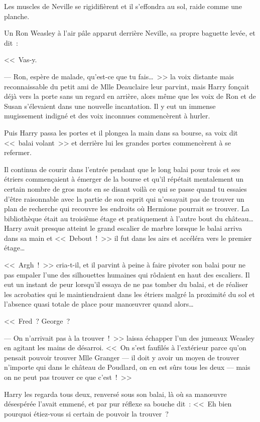 Les muscles de Neville se rigidifièrent et il s'effondra au sol, raide comme une planche.

Un Ron Weasley à l'air pâle apparut derrière Neville, sa propre baguette levée, et dit~:

<<~Vas-y.

--- Ron, espère de malade, qu'est-ce que tu fais…~>> la voix distante mais reconnaissable du petit ami de Mlle Deauclaire leur parvint, mais Harry fonçait déjà vers la porte sans un regard en arrière, alors même que les voix de Ron et de Susan s'élevaient dans une nouvelle incantation. Il y eut un immense mugissement indigné et des voix inconnues commencèrent à hurler.

Puis Harry passa les portes et il plongea la main dans sa bourse, sa voix dit <<~balai volant~>> et derrière lui les grandes portes commencèrent à se refermer.

Il continua de courir dans l'entrée pendant que le long balai pour trois et ses étriers commençaient à émerger de la bourse et qu'il répétait mentalement un certain nombre de gros mots en se disant voilà ce qui se passe quand tu essaies d'être raisonnable avec la partie de son esprit qui n'essayait pas de trouver un plan de recherche qui recouvre les endroits où Hermione pourrait se trouver. La bibliothèque était au troisième étage et pratiquement à l'autre bout du château… Harry avait presque atteint le grand escalier de marbre lorsque le balai arriva dans sa main et <<~Debout~!~>> il fut dans les airs et accéléra vers le premier étage…

<<~Argh~!~>> cria-t-il, et il parvint à peine à faire pivoter son balai pour ne pas empaler l'une des silhouettes humaines qui rôdaient en haut des escaliers. Il eut un instant de peur lorsqu'il essaya de ne pas tomber du balai, et de réaliser les acrobaties qui le maintiendraient dans les étriers malgré la proximité du sol et l'absence quasi totale de place pour manœuvrer quand alors…

<<~Fred~? George~?

--- On n'arrivait pas à la trouver~!~>> laissa échapper l'un des jumeaux Weasley en agitant les mains de désarroi. <<~On s'est faufilés à l'extérieur parce qu'on pensait pouvoir trouver Mlle Granger — il doit y avoir un moyen de trouver n'importe qui dans le château de Poudlard, on en est sûrs tous les deux — mais on ne peut pas trouver ce que c'est~!~>>

Harry les regarda tous deux, renversé sous son balai, là où sa manœuvre désespérée l'avait emmené, et par pur réflexe sa bouche dit~: <<~Eh bien pourquoi étiez-vous si certain de pouvoir la trouver~?


